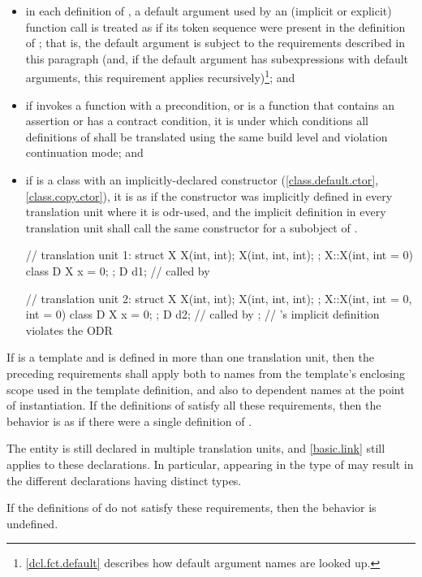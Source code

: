\begin{itemize}
\item in each definition of , a default argument used by an
(implicit or explicit) function call is treated as if its token sequence
were present in the definition of ; that is, the default
argument is subject to the requirements described in this paragraph (and, if
the default argument has subexpressions with default arguments, this
requirement applies recursively)\footnote{\ref{dcl.fct.default}
describes how default argument names are looked up.}; and

\item if  invokes a function with a precondition,
or is a function
that contains an assertion or has a contract condition,
it is 
under which conditions all definitions of 
shall be translated using the same build level
and violation continuation mode; and

\item if  is a class with an implicitly-declared
constructor (\ref{class.default.ctor}, \ref{class.copy.ctor}),
it is as if the constructor was
implicitly defined in every translation unit where it is odr-used, and the
implicit definition in every translation unit shall call the same
constructor for a subobject of .
\begin{example}

\begin{codeblock}
// translation unit 1:
struct X {
  X(int, int);
  X(int, int, int);
};
X::X(int, int = 0) { }
class D {
  X x = 0;
};
D d1;                           //  called by 

// translation unit 2:
struct X {
  X(int, int);
  X(int, int, int);
};
X::X(int, int = 0, int = 0) { }
class D {
  X x = 0;
};
D d2;                           //  called by ;
                                // 's implicit definition violates the ODR
\end{codeblock}
\end{example}
\end{itemize}
If  is a template and is defined in more than one
translation unit, then the preceding requirements
shall apply both to names from the template's enclosing scope used in the
template definition, and also to dependent names at
the point of instantiation. If the definitions of
 satisfy all these requirements, then the behavior is
as if there were a single definition of .
\begin{note}
The entity is still declared in multiple translation units, and \ref{basic.link}
still applies to these declarations. In particular,
appearing in the type of  may result
in the different declarations having distinct types.
\end{note}
If the definitions of
 do not satisfy these requirements, then the behavior is
undefined.%

